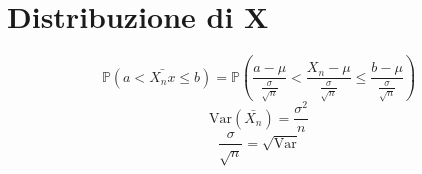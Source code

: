 \documentclass[12pt, a4paper, openany]{book}
\begin{document}
\section{Distribuzione di X}
\begin{equation*}
    \mathbb{P} (a  < \bar{X_nx} \leq b) = \mathbb{P} (\frac{a - \mu}{\frac{\sigma}{\sqrt{n}}} 
    < \frac{X_n - \mu}{\frac{\sigma}{\sqrt{n}}} \leq \frac{b - \mu}{\frac{\sigma}{\sqrt{n}}})   
\end{equation*}
\begin{equation*}
    \text{Var}(\bar{X_n}) = \frac{\sigma ^ 2}{n} 
\end{equation*}
\begin{equation*}
    \frac{\sigma}{\sqrt{n}} = \sqrt{\text{Var}}
\end{equation*}

\end{document}
